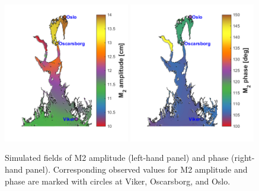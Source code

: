 \begin{figure}[hb] 
	\centerline{ 
		\includegraphics*[trim=1cm 0cm 0cm 0cm,clip=true,width=0.49\textwidth]{Figurer/M2amp_felt}  
		\includegraphics*[trim=0.8cm 0cm 0cm 0cm,clip=true,width=0.49\textwidth]{Figurer/M2fase_felt} 
		} 
	\caption{\small Simulated fields of M2 amplitude (left-hand panel) and phase (right-hand panel). Corresponding observed values for M2 amplitude and phase are marked with circles at Viker, Oscarsborg, and Oslo.} 
	\label{fig:M2field} 
\end{figure} 

